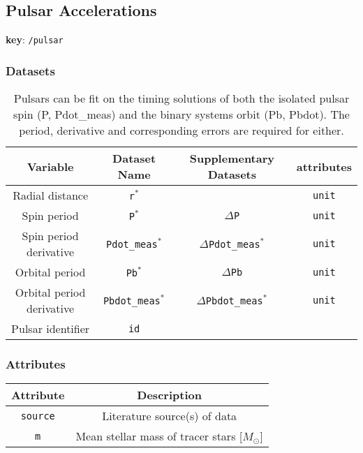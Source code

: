 \subsection{Pulsar Accelerations}

\textbf{key}: \texttt{/pulsar}

\subsubsection{Datasets}

\begin{center}
\begin{table}[H]
\begin{tabular}{ | c | c | c | c | }
    \hline
    Variable & Dataset Name & Supplementary Datasets &  attributes \\
    \hline\hline
    Radial distance & \texttt{r\(^*\)} & & \texttt{unit} \\
    \hline
    Spin period & \texttt{P\(^*\)} & \texttt{\(\Delta\)P} & \texttt{unit}\\
    \hline
    Spin period derivative & \texttt{Pdot\_meas\(^*\)} &
    \texttt{\(\Delta\)Pdot\_meas\(^*\)} & \texttt{unit} \\
    \hline
    Orbital period & \texttt{Pb\(^*\)} & \texttt{\(\Delta\)Pb} & \texttt{unit}\\
    \hline
    Orbital period derivative & \texttt{Pbdot\_meas\(^*\)} &
    \texttt{\(\Delta\)Pbdot\_meas\(^*\)} & \texttt{unit} \\
    \hline
    Pulsar identifier & \texttt{id} & & \\
    \hline
\end{tabular}
\caption*{
    Pulsars can be fit on the timing solutions of both the isolated
    pulsar spin (P, Pdot\_meas) and the binary systems orbit (Pb, Pbdot).
    The period, derivative and corresponding errors are required for either.
}
\end{table}
\end{center}

\subsubsection{Attributes}


\begin{center}
\begin{table}[H]
\begin{tabular}{ | c | c | }
    \hline
    Attribute & Description \\
    \hline\hline
    \texttt{source} & Literature source(s) of data \\
    \hline
    \texttt{m} & Mean stellar mass of tracer stars [\(M_\odot\)] \\
    \hline
\end{tabular}
\end{table}
\end{center}
